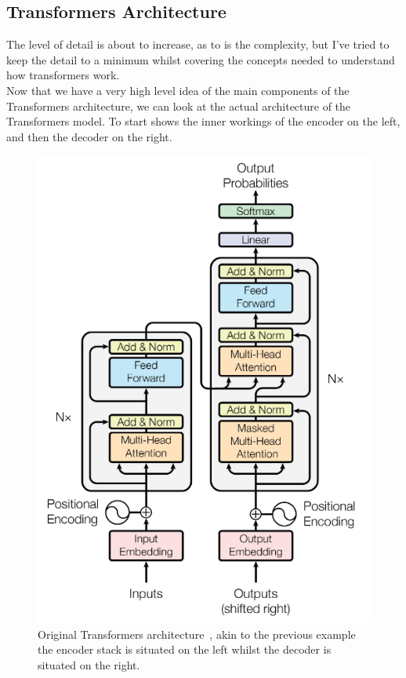 \subsection{Transformers Architecture}
The level of detail is about to increase, as to is the complexity, but I've tried to keep the detail to
a minimum whilst covering the concepts needed to understand how transformers work.\\
Now that we have a very high level idea of the main components of the Transformers architecture, we can look at the actual architecture of
the Transformers model. To start  shows the inner workings of the encoder on the left, and then the decoder on the right.
\begin{figure}[H]
	\centering
	\includegraphics[width=0.55\linewidth]{figures/original_transformer_archi.png}
	\caption[Original Transformers Architecture~\autocite{vaswaniAttentionAllYou}]{Original Transformers architecture~\autocite{vaswaniAttentionAllYou}, akin to the previous example the encoder stack
		is situated on the left whilst the decoder is situated on the right.}
	\label{fig:transformer_architecture}
\end{figure}
